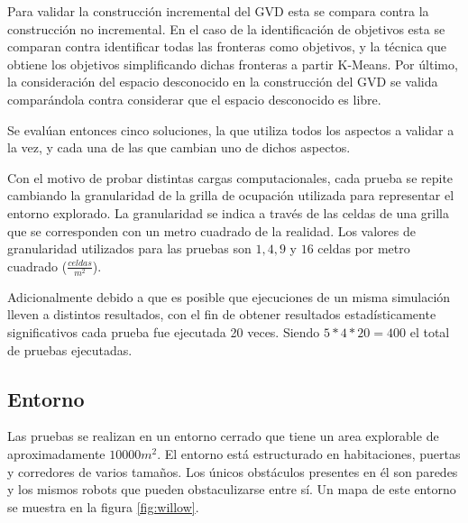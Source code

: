 Para validar la construcción incremental del GVD esta se compara contra la
construcción no incremental. En el caso de la identificación de objetivos esta se
comparan contra identificar todas las fronteras como objetivos, y la técnica
que obtiene los objetivos simplificando dichas fronteras a partir K-Means. Por
último, la consideración del espacio desconocido en la construcción del GVD se
valida comparándola contra considerar que el espacio desconocido es libre. 

Se evalúan entonces cinco soluciones, la que utiliza todos los aspectos a
validar a la vez, y cada una de las que cambian uno de dichos aspectos.

Con el motivo de probar distintas cargas computacionales, cada prueba se repite
cambiando la granularidad de la grilla de ocupación utilizada para representar
el entorno explorado. La granularidad se indica a través de las celdas de una
grilla que se corresponden con un metro cuadrado de la realidad. Los valores de
granularidad utilizados para las pruebas son $1,4,9$ y $16$ celdas
por metro cuadrado ($\frac{celdas}{m^2}$). 

Adicionalmente debido a que es posible que ejecuciones de un misma simulación
lleven a distintos resultados, con el fin de obtener resultados
estadísticamente significativos cada prueba fue ejecutada 20 veces. Siendo 
$5*4*20=400$ el total de pruebas ejecutadas.


\subsection{Entorno}
Las pruebas se realizan en un entorno cerrado que tiene un area explorable de
aproximadamente $10000m^2$. El entorno está estructurado en habitaciones,
puertas y corredores de varios tamaños. Los únicos obstáculos presentes en él
son paredes y los mismos robots que pueden obstaculizarse entre
sí. Un mapa de este entorno se muestra en la figura
\ref{fig:willow}.

